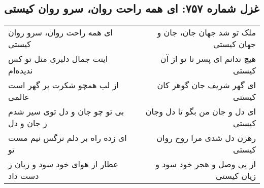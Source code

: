 \begin{center}
\section*{غزل شماره ۷۵۷: ای همه راحت روان، سرو روان کیستی}
\label{sec:757}
\begin{longtable}{l p{0.5cm} r}
ای همه راحت روان، سرو روان کیستی
&&
ملک تو شد جهان جان، جان و جهان کیستی
\\
اینت جمال دلبری مثل تو کس ندیده‌ام
&&
هیچ ندانم ای پسر تا تو از آن کیستی
\\
از لب همچو شکرت پر گهر است عالمی
&&
ای گهر شریف جان گوهر کان کیستی
\\
بی تو چو جان و دل توی سیر شدم ز جان و دل
&&
ای دل و جان من بگو تا دل وجان کیستی
\\
ای زده راه بر دلم نرگس نیم مست تو
&&
رهزن دل شدی مرا روح روان کیستی
\\
عطار از هوای خود سود و زیان ز دست داد
&&
از پی وصل و هجر خود سود و زیان کیستی
\\
\end{longtable}
\end{center}

